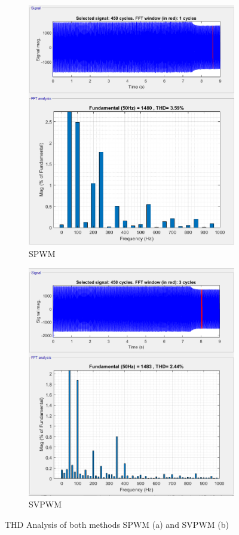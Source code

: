 \begin{figure}[H]
        \centering
        \begin{subfigure}[b]{0.475\textwidth}
            \centering
            \includegraphics[width = 7 cm, height = 9 cm]{figs/FFT_Sine_PWM.PNG}
            \caption{SPWM}
            \label{fig:thd_s}
        \end{subfigure}
        \hfill
        \begin{subfigure}[b]{0.475\textwidth}  
            \centering 
            \includegraphics[width = 7 cm, height = 9 cm]{figs/FFT_SVPWM.PNG}
            \caption{SVPWM}
            \label{fig:thd_sv}
        \end{subfigure}
        \caption{THD Analysis of both methods SPWM (a) and SVPWM (b)}
        \label{fig:thd}
        \end{figure}  
        

